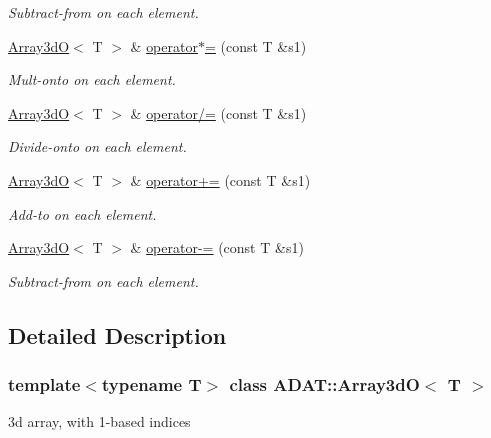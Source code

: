 \begin{DoxyCompactItemize}
\begin{DoxyCompactList}\small\item\em Subtract-\/from on each element. \end{DoxyCompactList}\item 
\mbox{\hyperlink{classADAT_1_1Array3dO}{Array3dO}}$<$ T $>$ \& \mbox{\hyperlink{classADAT_1_1Array3dO_acec17a674874030d454e516aad24f8a8}{operator$\ast$=}} (const T \&s1)
\begin{DoxyCompactList}\small\item\em Mult-\/onto on each element. \end{DoxyCompactList}\item 
\mbox{\hyperlink{classADAT_1_1Array3dO}{Array3dO}}$<$ T $>$ \& \mbox{\hyperlink{classADAT_1_1Array3dO_a9d82ba391c67603f43b112c945532de6}{operator/=}} (const T \&s1)
\begin{DoxyCompactList}\small\item\em Divide-\/onto on each element. \end{DoxyCompactList}\item 
\mbox{\hyperlink{classADAT_1_1Array3dO}{Array3dO}}$<$ T $>$ \& \mbox{\hyperlink{classADAT_1_1Array3dO_a6e5f624a1a14555b030d5fb53cb85f9c}{operator+=}} (const T \&s1)
\begin{DoxyCompactList}\small\item\em Add-\/to on each element. \end{DoxyCompactList}\item 
\mbox{\hyperlink{classADAT_1_1Array3dO}{Array3dO}}$<$ T $>$ \& \mbox{\hyperlink{classADAT_1_1Array3dO_a0341b7ddc224910074b55646bca45e2a}{operator-\/=}} (const T \&s1)
\begin{DoxyCompactList}\small\item\em Subtract-\/from on each element. \end{DoxyCompactList}\end{DoxyCompactItemize}


\subsection{Detailed Description}
\subsubsection*{template$<$typename T$>$\newline
class A\+D\+A\+T\+::\+Array3d\+O$<$ T $>$}

3d array, with 1-\/based indices 

